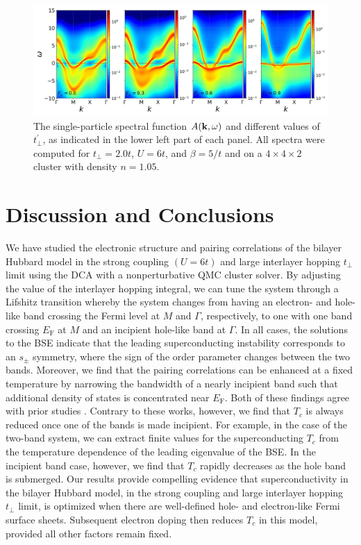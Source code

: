 \documentclass[prb,twocolumn,amsmath,amssymb,superscriptaddress,floatfix,nofootinbib]{revtex4-2}
\begin{document}
 
 
\begin{figure}
\centering
\includegraphics[width=\textwidth]{Akw_U6_n0pt95_bt5_tp2_tpp0_0pt3_0pt6_0pt9.png}
\caption{The single-particle spectral function $A({\bf k},\omega)$ and different values of $t_{\perp}^{\prime}$, as indicated in the lower left part of each panel. All spectra were computed for $t_{\perp}=2.0t$, $U=6t$, and $\beta=5/t$ and on a $4\times 4\times 2$ cluster with density $n=1.05$.}
\label{fig:Akwtperprime_n0.95}
\end{figure}


\section{Discussion and Conclusions}\label{sec:discussion} 
We have studied the electronic structure and pairing correlations of the bilayer Hubbard model in the strong coupling $(U = 6t)$ and large interlayer hopping $t_\perp$ limit using the DCA with a nonperturbative QMC cluster solver. By adjusting the value of the interlayer hopping integral, we can tune the system through a Lifshitz transition whereby the system changes from having an electron- and hole-like band crossing the Fermi level at $M$ and $\Gamma$, respectively, to one with one band crossing $E_\mathrm{F}$ at $M$ and an incipient hole-like band at $\Gamma$. In all cases, the solutions to the BSE indicate that the leading superconducting instability corresponds to an $s_\pm$ symmetry, 
where the sign of the order parameter changes between the two bands. Moreover, we find that the pairing correlations can be enhanced at a fixed temperature by narrowing the bandwidth of a nearly incipient band such that additional density of states is concentrated near $E_\mathrm{F}$. Both of these findings agree with prior studies \cite{BangNJP2014, ChenPRB2015, Mishra2016, KurokiFlex2020, LinscheidPRL2016, RademakerEnhanced2021}. 
Contrary to these works, however, we find that $T_c$ is always reduced once one of the 
bands is made incipient.  For example, in the case of the two-band system, we can extract finite values for the superconducting $T_c$ from the temperature dependence of the leading eigenvalue of the BSE. In the incipient band case, however, we find that $T_c$ rapidly decreases as the hole band is submerged. Our results provide compelling evidence that superconductivity in the bilayer Hubbard model, in the strong coupling and large interlayer hopping $t_\perp$ limit, is optimized when there are well-defined hole- and electron-like Fermi surface sheets. Subsequent electron doping then reduces $T_c$ in this model, provided all other factors remain fixed. 
\end{document}

